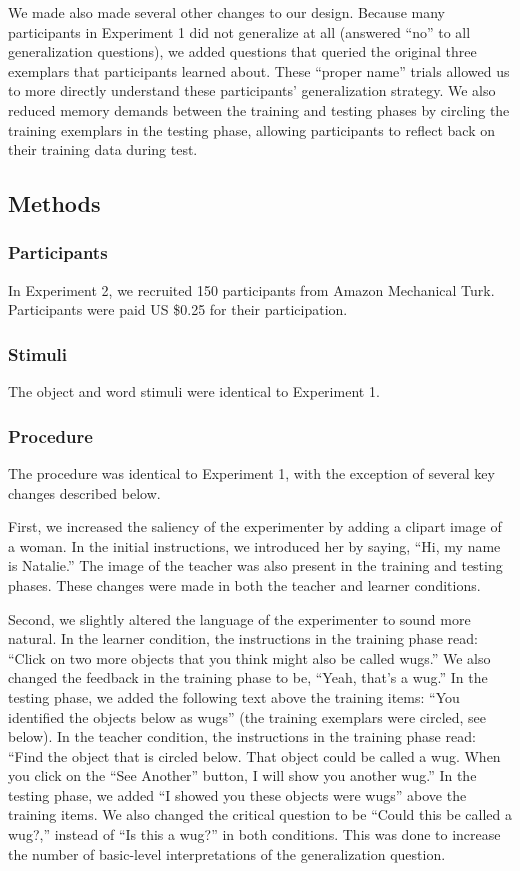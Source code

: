 \documentclass[man]{apa2}
\begin{document}
We made also made several other changes to our design. Because many participants in Experiment 1 did not generalize at all (answered ``no'' to all generalization questions), we added questions that queried the original three exemplars that participants learned about. These ``proper name'' trials allowed us to more directly understand these participants' generalization strategy. We also reduced memory demands between the training and testing phases by circling the training exemplars in the testing phase, allowing participants to reflect back on their training data during test.

\subsection{Methods}

\subsubsection{Participants} In Experiment 2, we recruited 150 participants from Amazon Mechanical Turk. Participants were paid US \$0.25 for their participation.

\subsubsection{Stimuli}
The object and word stimuli were identical to Experiment 1.

\subsubsection{Procedure}
The procedure was identical to Experiment 1, with the exception of several key changes described below.

First, we increased the saliency of the experimenter by adding a clipart image of a woman. In the initial instructions, we introduced her by saying, ``Hi, my name is Natalie.'' The image of the teacher was also present in the training and testing phases. These changes were made in both the teacher and learner conditions.

Second, we slightly altered the language of the experimenter to sound more natural. In the learner condition, the instructions in the training phase read: ``Click on two more objects that you think might also be called wugs.'' We also changed the feedback in the training phase to be, ``Yeah, that's a wug.'' In the testing phase, we added the following text above the training items: ``You identified the objects below as wugs'' (the training exemplars were circled, see below). In the teacher condition, the instructions in the training phase read: ``Find the object that is circled below. That object could be called a wug. When you click on the ``See Another'' button, I will show you another wug.'' In the testing phase, we added ``I showed you these objects were wugs'' above the training items. We also changed the critical question to be ``Could this be called a wug?,'' instead of ``Is this a wug?'' in both conditions. This was done to increase the number of basic-level interpretations of the generalization question. 
\end{document}
